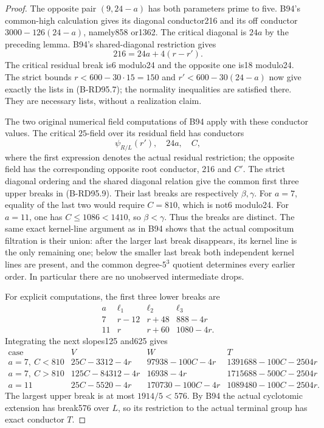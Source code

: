 \begin{proof}
The opposite pair $(9,24-a)$ has both parameters prime to five.
B94's common-high calculation gives its diagonal conductor216 and
its off conductor $3000-126(24-a)$, namely858 or1362.
The critical diagonal is $24a$ by the preceding lemma. B94's
shared-diagonal restriction gives
\[
                         216=24a+4(r-r').             \tag{B-RD95.12}
\]
The critical residual break is6 modulo24 and the opposite one
is18 modulo24. The strict bounds
$r<600-30\cdot15=150$ and $r'<600-30(24-a)$ now give exactly
the lists in (B-RD95.7); the normality inequalities are satisfied
there. They are necessary lists, without a realization claim.

The two original numerical field computations of B94 apply with
these conductor values. The critical $25$-field over its residual
field has conductors
\[
 \psi_{R/L}(r'),\quad24a,\quad C,
\]
where the first expression denotes the actual residual restriction;
the opposite field has the corresponding opposite root conductor,
216 and $C'$. The strict diagonal ordering and the shared diagonal
relation give the common first three upper breaks in (B-RD95.9).
Their last breaks are respectively $\beta,\gamma$.
For $a=7$, equality of the last two would require $C=810$, which
is not6 modulo24. For $a=11$, one has $C\le1086<1410$, so
$\beta<\gamma$. Thus the breaks are distinct. The same exact
kernel-line argument as in B94 shows that the actual compositum
filtration is their union: after the larger last break disappears,
its kernel line is the only remaining one; below the smaller last
break both independent kernel lines are present, and the common
degree-$5^3$ quotient determines every earlier order. In particular
there are no unobserved intermediate drops.

For explicit computations, the first three lower breaks are
\[
\begin{array}{c|ccc}
 a&\ell_1&\ell_2&\ell_3\\\hline
 7&r-12&r+48&888-4r\\
 11&r&r+60&1080-4r.
\end{array}                                           \tag{B-RD95.13}
\]
Integrating the next slopes125 and625 gives
\[
\begin{array}{c|c|c|c}
 \text{case}&V&W&T\\\hline
 a=7,\ C<810&25C-3312-4r&97938-100C-4r&1391688-100C-2504r\\
 a=7,\ C>810&125C-84312-4r&16938-4r&1715688-500C-2504r\\
 a=11&25C-5520-4r&170730-100C-4r&1089480-100C-2504r.
\end{array}                                           \tag{B-RD95.14}
\]
The largest upper break is at most $1914/5<576$. By B94 the
actual cyclotomic extension has break576 over $L$, so its
restriction to the actual terminal group has exact conductor $T$.


\end{proof}
